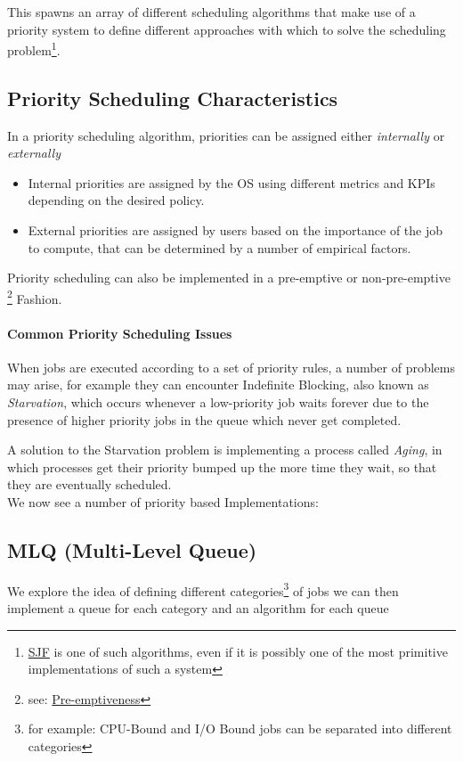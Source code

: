 \documentclass[openright, twoside]{report}
\theoremstyle{definition}
\theoremstyle{example}
\begin{document}
		This spawns an array of different scheduling algorithms that make use of a
		priority system to define different approaches with which to solve the scheduling 
		problem\footnote{\hyperref[ssec:SJF]{SJF} is one of such algorithms, even if it is 
		possibly one of the most primitive implementations of such a system}.
				
		\subsection{Priority Scheduling Characteristics}
		In a priority scheduling algorithm, priorities can be assigned either 
		\emph{internally} or \emph{externally}

		\begin{itemize}
			\item Internal priorities are assigned by the OS using different metrics and 
			KPIs depending on the desired policy.
			\item External priorities are assigned by users based on the importance of the
			job to compute, that can be determined by a number of empirical factors.
		\end{itemize}

		Priority scheduling can also be implemented in a pre-emptive or non-pre-emptive
		\footnote{see: \hyperref[par:preem]{Pre-emptiveness}} Fashion.

		\paragraph{Common Priority Scheduling Issues}
		When jobs are executed according to a set of priority rules, a number of problems
		may arise, for example they can encounter Indefinite Blocking, also known as 
		\emph{Starvation}, which occurs whenever a low-priority job waits forever due to 
		the presence of higher priority jobs in the queue which never get completed.

		A solution to the Starvation problem is implementing a process called \emph{Aging},
		in which processes get their priority bumped up the more time they wait, so that 
		they are eventually scheduled. \\ 

		We now see a number of priority based Implementations:


	
	\subsection{MLQ (Multi-Level Queue)}
	\label{ssec:MLQ}
	We explore the idea of defining different categories\footnote{for example: CPU-Bound
	and I/O Bound jobs can be separated into different categories} of jobs we can then implement
	a queue for each category and an algorithm for each queue
\end{document}
